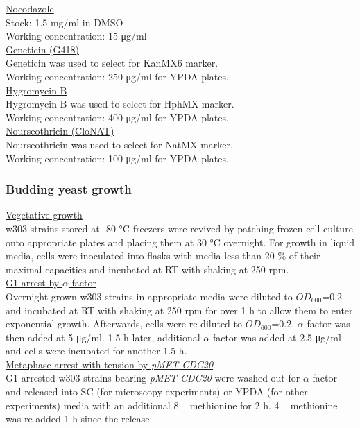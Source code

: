\underline{Nocodazole}\\
Stock: 1.5 \si{\milli\gram/\milli\litre} in DMSO \\
Working concentration: 15 \si{\micro\gram/\milli\litre} \\

\underline{Geneticin (G418)} \\ 
Geneticin was used to select for KanMX6 marker.\\
Working concentration: 250 \si{\micro\gram/\milli\litre} for YPDA plates.\\

\underline{Hygromycin-B}\\
Hygromycin-B was used to select for HphMX marker.\\
Working concentration: 400 \si{\micro\gram/\milli\litre} for YPDA plates.\\

\underline{Nourseothricin (CloNAT)}\\
Nourseothricin was used to select for NatMX marker. \\
Working concentration: 100 \si{\micro\gram/\milli\litre} for YPDA plates.\\

\subsubsection{Budding yeast growth}
\underline{Vegetative growth}\\
w303 strains stored at -80 \si{\celsius} freezers were revived by patching frozen cell culture onto appropriate plates and placing them at 30 \si{\celsius} overnight. For growth in liquid media, cells were inoculated into flasks with media less than 20 \% of their maximal capacities and incubated at RT with shaking at 250 rpm. \\

\underline{G1 arrest by $\alpha$ factor}\\
Overnight-grown w303 strains in appropriate media were diluted to $OD_{600}$=0.2 and incubated at RT with shaking at 250 rpm for over 1 \si{\hour} to allow them to enter exponential growth. Afterwards, cells were re-diluted to $OD_{600}$=0.2. $\alpha$ factor was then added at 5 \si{\micro\gram/\milli\litre}. 1.5 \si{\hour} later, additional $\alpha$ factor was added at 2.5 \si{\micro\gram/\milli\litre} and cells were incubated for another 1.5 \si{\hour}.\\

\underline{Metaphase arrest with tension by \textit{pMET-CDC20}}\\
G1 arrested w303 strains bearing \textit{pMET-CDC20} were washed out for $\alpha$ factor and released into SC (for microscopy experiments) or YPDA (for other experiments) media with an additional 8 \si{\milli\Molar} methionine for 2 \si{\hour}. 4 \si{\milli\Molar} methionine was re-added 1 \si{\hour} since the release. \\

